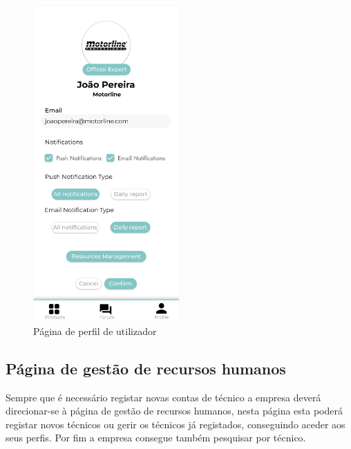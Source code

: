 \begin{figure}[htb]
    \centering
    \includegraphics[width=0.5\textwidth]{images/mockups/user_profile.png}
    \caption{Página de perfil de utilizador}
    \label{fig:23}
\end{figure}

\subsection{Página de gestão de recursos humanos}

Sempre que é necessário registar novas contas de técnico a empresa deverá direcionar-se à página de gestão
de recursos humanos, nesta página esta poderá registar novos técnicos ou gerir os técnicos já registados,
conseguindo aceder aos seus perfis. Por fim a empresa consegue também pesquisar por técnico.

